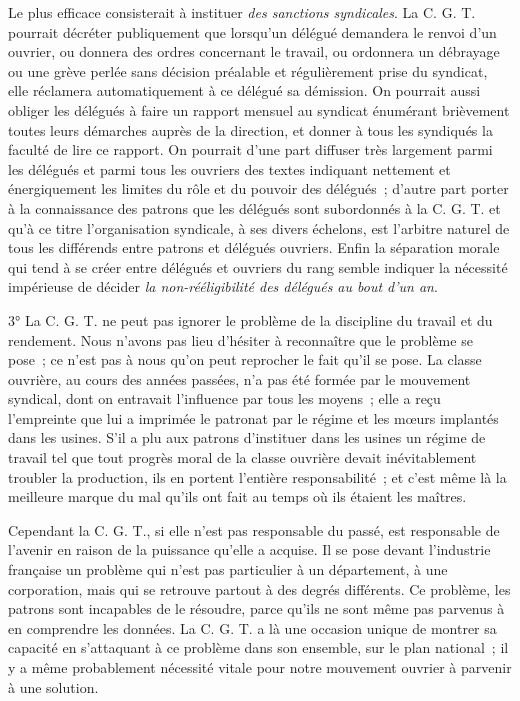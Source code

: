 \documentclass[french,twoside]{book} %
\begin{document}
Le plus efficace consisterait à instituer {\itshape des sanctions syndicales}. La C. G. T. pourrait décréter publiquement que lorsqu'un délégué demandera le renvoi d'un ouvrier, ou donnera des ordres concernant le travail, ou ordonnera un débrayage ou une grève perlée sans décision préalable et régulièrement prise du syndicat, elle réclamera automatiquement à ce délégué sa démission. On pourrait aussi obliger les délégués à faire un rapport mensuel au syndicat énumérant brièvement toutes leurs démarches auprès de la direction, et donner à tous les syndiqués la faculté de lire ce rapport. On pourrait d'une part diffuser très largement parmi les délégués et parmi tous les ouvriers des textes indiquant nettement et énergiquement les limites du rôle et du pouvoir des délégués ; d'autre part porter à la connaissance des patrons que les délégués sont subordonnés à la C. G. T. et qu'à ce titre l'organisation syndicale, à ses divers échelons, est l'arbitre naturel de tous les différends entre patrons et délégués ouvriers. Enfin la séparation morale qui tend à se créer entre délégués et ouvriers du rang semble indiquer la nécessité impérieuse de décider {\itshape la non-rééligibilité des délégués au bout d'un an}.\par
3° La C. G. T. ne peut pas ignorer le problème de la discipline du travail et du rendement. Nous n'avons pas lieu d'hésiter à reconnaître que le problème se pose ; ce n'est pas à nous qu'on peut reprocher le fait qu'il se pose. La classe ouvrière, au cours des années passées, n'a pas été formée par le mouvement syndical, dont on entravait l'influence par tous les moyens ; elle a reçu l'empreinte que lui a imprimée le patronat par le régime et les mœurs implantés dans les usines. S'il a plu aux patrons d'instituer dans les usines un régime de travail tel que tout progrès moral de la classe ouvrière devait inévitablement troubler la production, ils en portent l'entière responsabilité ; et c'est même là la meilleure marque du mal qu'ils ont fait au temps où ils étaient les maîtres.\par
Cependant la C. G. T., si elle n'est pas responsable du passé, est responsable de l'avenir en raison de la puissance qu'elle a acquise. Il se pose devant l'industrie française un problème qui n'est pas particulier à un département, à une corporation, mais qui se retrouve partout à des degrés différents. Ce problème, les patrons sont incapables de le résoudre, parce qu'ils ne sont même pas parvenus à en comprendre les données. La C. G. T. a là une occasion unique de montrer sa capacité en s'attaquant à ce problème dans son ensemble, sur le plan national ; il y a même probablement nécessité vitale pour notre mouvement ouvrier à parvenir à une solution.\par
\end{document}

